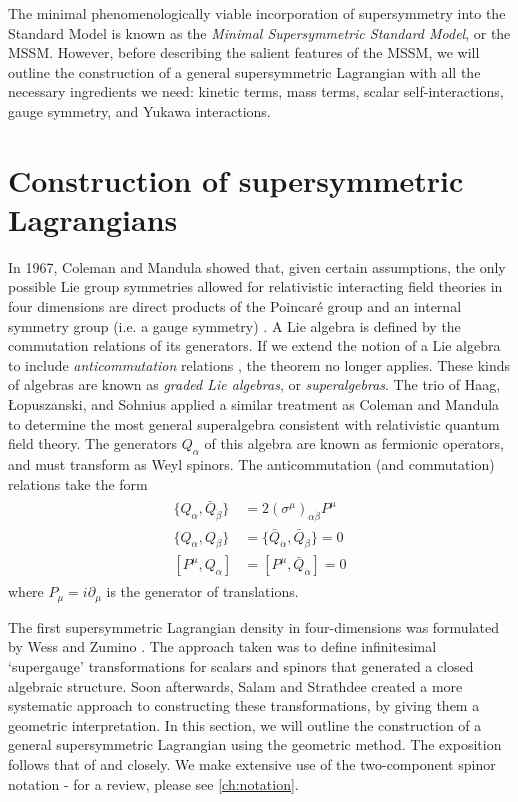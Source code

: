 The minimal phenomenologically viable incorporation of supersymmetry into the Standard Model is known as the \emph{Minimal Supersymmetric Standard Model}, or the MSSM. However, before describing the salient features of the MSSM, we will outline the construction of a general supersymmetric Lagrangian with all the necessary ingredients we need: kinetic terms, mass terms, scalar self-interactions, gauge symmetry, and Yukawa interactions.

\section{Construction of supersymmetric Lagrangians}
In 1967, Coleman and Mandula \citep{Coleman1967} showed that, given certain assumptions, the only possible Lie group symmetries allowed for relativistic interacting field theories in four dimensions are direct products of the Poincar\'e group and an internal symmetry group (i.e. a gauge symmetry) \citep{Mandula2015}.
A Lie algebra is defined by the commutation relations of its generators. If we extend the notion of a Lie algebra to include \emph{anticommutation} relations \citep{Wess1992}, the theorem no longer applies. These kinds of algebras are known as \emph{graded Lie algebras}, or \emph{superalgebras}. The trio of Haag, Łopuszanski, and Sohnius \citep{Haag1975} applied a similar treatment as Coleman and Mandula to determine the most general superalgebra consistent with relativistic quantum field theory. The generators $Q_\alpha$ of this algebra are known as fermionic operators, and must transform as Weyl spinors. The anticommutation (and commutation) relations take the form
\begin{align}
  \begin{split}
  \{Q_\alpha, \bar{Q}_{\dot{\beta}}\} &= 2(\sigma^\mu)_{\alpha\dot{\beta}}P^\mu\\
  \{Q_\alpha, Q_\beta\} &= \{\bar{Q}_{\dot{\alpha}}, \bar{Q}_{\dot{\beta}}\} = 0\\
  [P^\mu,Q_\alpha] &= [P^\mu,\bar{Q}_{\dot{\alpha}}] = 0
\end{split}
\label{eq:susy_algebra}
\end{align}
where $P_\mu = i\partial_\mu$ is the generator of translations. 

The first supersymmetric Lagrangian density in four-dimensions was formulated by Wess and Zumino \citep{Wess1974}. The approach taken was to define infinitesimal `supergauge' transformations for scalars and spinors that generated a closed algebraic structure. Soon afterwards, Salam and Strathdee \citep{Salam1974} created a more systematic approach to constructing these transformations, by giving them a geometric interpretation. In this section, we will outline the construction of a general supersymmetric Lagrangian using the geometric method. The exposition follows that of \citep{Zee2010} and \citep{Martin1997} closely. We make extensive use of the two-component spinor notation - for a review, please see \autoref{ch:notation}.

